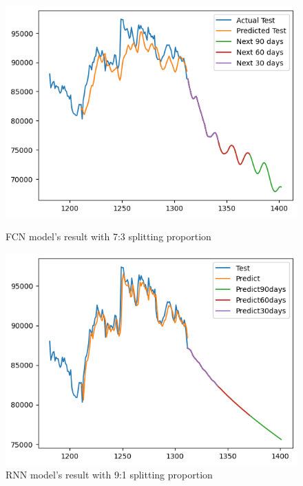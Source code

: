 \documentclass{ieeeojies}
\begin{document}
\begin{figure}[H]
    \centering
    \begin{minipage}{0.45\linewidth}
        \centering
        \includegraphics[width=\linewidth]{bibliography/diagram/FCN-VCB.png}
        \caption{FCN model’s result with 7:3 splitting proportion}
        \label{fig:FCN-VCB}
    \end{minipage}
    \hfill
    \begin{minipage}{0.45\linewidth}
        \centering
        \includegraphics[width=\linewidth]{bibliography/diagram/RNN-VCB.png}
        \caption{RNN model’s result with 9:1 splitting proportion}
        \label{fig:RNN-VCB}
    \end{minipage}
\end{figure}
\end{document}
